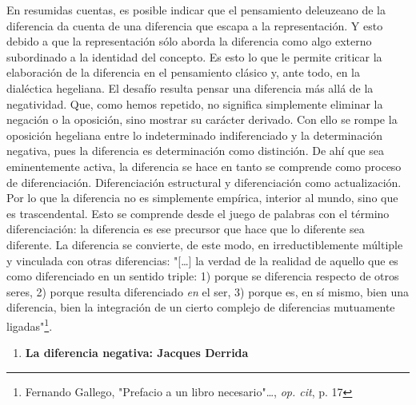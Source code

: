 \documentclass{book}
\begin{document}
En resumidas cuentas, es posible indicar que el pensamiento deleuzeano
de la diferencia da cuenta de una diferencia que escapa a la
representación. Y esto debido a que la representación sólo aborda la
diferencia como algo externo subordinado a la identidad del concepto. Es
esto lo que le permite criticar la elaboración de la diferencia en el
pensamiento clásico y, ante todo, en la dialéctica hegeliana. El desafío
resulta pensar una diferencia más allá de la negatividad. Que, como
hemos repetido, no significa simplemente eliminar la negación o la
oposición, sino mostrar su carácter derivado. Con ello se rompe la
oposición hegeliana entre lo indeterminado indiferenciado y la
determinación negativa, pues la diferencia es determinación como
distinción. De ahí que sea eminentemente activa, la diferencia se hace
en tanto se comprende como proceso de diferenciación. Diferenciación
estructural y diferenciación como actualización. Por lo que la
diferencia no es simplemente empírica, interior al mundo, sino que es
trascendental. Esto se comprende desde el juego de palabras con el
término diferenciación: la diferencia es ese precursor que hace que lo
diferente sea diferente. La diferencia se convierte, de este modo, en
irreductiblemente múltiple y vinculada con otras diferencias:
"{[}\ldots{]} la verdad de la realidad de aquello que es como
diferenciado en un sentido triple: 1) porque se diferencia respecto de
otros seres, 2) porque resulta diferenciado \emph{en} el ser, 3) porque
es, en sí mismo, bien una diferencia, bien la integración de un cierto
complejo de diferencias mutuamente ligadas"\footnote{Fernando Gallego,
  "Prefacio a un libro necesario"\ldots, \emph{op. cit}, p. 17}.

\begin{enumerate}
\def\labelenumi{\arabic{enumi}.}
\setcounter{enumi}{3}
\item
  \textbf{La diferencia negativa: Jacques Derrida}
\end{enumerate}
\end{document}

